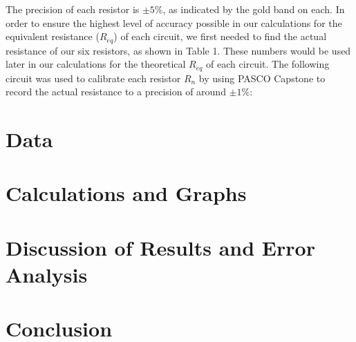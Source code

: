 \documentclass[12pt,letterpaper,titlepage]{report}
\begin{document}
\bigskip
\begin{minipage}{\linewidth}
\centering

\end{minipage}
\bigskip

The precision of each resistor is $\pm 5 \%$, as indicated by the gold band on each. In order to ensure the highest level of accuracy possible in our calculations for the equivalent resistance ($R_{eq}$) of each circuit, we first needed to find the actual resistance of our six resistors, as shown in Table 1. These numbers would be used later in our calculations for the theoretical $R_{eq}$ of each circuit. The following circuit was used to calibrate each resistor $R_n$ by using PASCO Capstone to record the actual resistance to a precision of around $\pm 1 \%$:

\bigskip
\begin{minipage}{\linewidth}
\centering

\end{minipage}
\bigskip




\bigskip
\section*{Data}


\begin{minipage}{\linewidth}
\centering
{}

\end{minipage}

\bigskip
\bigskip

\begin{minipage}{\linewidth}
\centering
{}

\end{minipage}

\bigskip
\bigskip

\begin{minipage}{\linewidth}
\centering
{}

\end{minipage}



\bigskip
\section*{Calculations and Graphs}



\bigskip
\section*{Discussion of Results and Error Analysis}



\bigskip
\section*{Conclusion}


\end{document}
